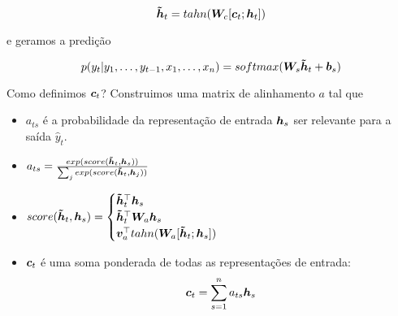 \begin{equation}
\bm{\tilde{h}}_t = tahn(\bm{W}_c[\bm{c}_t;\bm{h}_t])
\end{equation}

e geramos a predição

\begin{equation}
p(y_t | y_1, \dots, y_{t-1}, x_1, \dots, x_{n}) = softmax(\bm{W}_{s}  \bm{\tilde{h}}_t + \bm{b}_s)
\end{equation}


Como definimos $\bm{c}_t$? Construimos uma matrix de alinhamento $a$ tal que

\begin{itemize}
\item $a_{ts}$ é a probabilidade da representação de entrada $\bm{h}_s$ ser relevante para a saída $\hat{y}_t$.
\item $a_{ts} = \frac{exp(score(\bm{\tilde{h}}_t,\bm{h}_s))}{\sum_j exp(score(\bm{\tilde{h}}_t,\bm{h}_j))}$ 
\item $score(\bm{\tilde{h}}_t,\bm{h}_s) = \begin{cases}
\bm{\tilde{h}}_t ^{\top}\bm{h}_s\\
\bm{\tilde{h}}_t ^{\top}\bm{W}_a \bm{h}_s\\
\bm{v}_a ^{\top}tahn(\bm{W}_a[\bm{\tilde{h}}_t;\bm{h}_s])\\
\end{cases}$ 
\item $\bm{c}_t$ é uma soma ponderada de todas as representações de entrada: 
\begin{equation}
\bm{c}_t = \sum_{s=1}^{n} a_{ts}\bm{h}_s
\end{equation}
\end{itemize}
